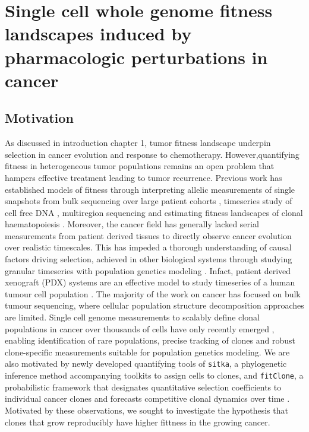 
{\chapter{Single  cell  whole genome fitness  landscapes  induced  by pharmacologic perturbations in cancer}
}
\label{ch:Chapter4}

\section{Motivation}
As discussed in introduction chapter 1, tumor fitness landscape underpin selection in cancer evolution and response to chemotherapy. However,quantifying fitness in heterogeneous tumor populations remains an open problem that hampers effective treatment leading to tumor recurrence. Previous work has established models of fitness through interpreting allelic measurements of single snapshots \cite{williams2016identification, williams2018quantification,gerstung2020evolutionary,shah2012clonal,nik2012life} from bulk sequencing over large patient cohorts \cite{martincorena2017universal}, timeseries study of cell free DNA \cite{khan2018longitudinal}, multiregion sequencing \cite{Gerlinger2014-qd,Jamal-Hanjani2017-yc,Lopez2020-ku,mcpherson2016divergent,williams2018quantification} and estimating fitness landscapes of clonal haematopoiesis \cite{Watson2020-yu}. Moreover, the cancer field has generally lacked serial measurements from patient derived tissues to directly observe cancer evolution over realistic timescales. This has impeded a thorough understanding of causal factors driving selection, achieved in other biological systems through studying granular timeseries with population genetics modeling \cite{good2017dynamics}. Infact, patient derived xenograft (PDX) systems are an effective model to study timeseries of a human tumour cell population \cite{williams2018using,willey2015patient}.
The majority of the work on cancer has focused on bulk tumour sequencing, where cellular population structure decomposition approaches are limited. Single cell genome measurements to scalably define clonal populations in cancer over thousands of cells have only recently emerged \cite{Laks2019-dm,zahn2017scalable}, enabling identification of rare populations, precise tracking of clones and robust clone-specific measurements suitable for population genetics modeling. We are also motivated by newly developed quantifying tools of \texttt{sitka}, a phylogenetic inference method accompanying toolkits to assign cells to clones, \cite{dorri2020efficient} and  \texttt{fitClone}, a probabilistic framework that designates quantitative selection coefficients to individual cancer clones and forecasts competitive clonal dynamics over time \cite{salehi2020single}. Motivated by these observations, we sought to investigate the hypothesis that clones that grow reproducibly have higher fittness in the growing cancer.



